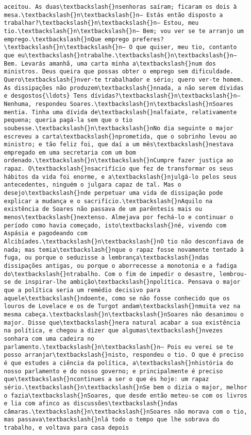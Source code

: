 \documentclass[11pt]{article}
\begin{document}
\begin{Verbatim}[commandchars=\\\{\}]
aceitou. As duas\textbackslash{}nsenhoras saíram; ficaram os dois à mesa.\textbackslash{}n\textbackslash{}n— Estás então disposto a trabalhar?\textbackslash{}n\textbackslash{}n— Estou, meu tio.\textbackslash{}n\textbackslash{}n— Bem; vou ver se te arranjo um emprego.\textbackslash{}nQue emprego preferes?\textbackslash{}n\textbackslash{}n— O que quiser, meu tio, contanto que eu\textbackslash{}ntrabalhe.\textbackslash{}n\textbackslash{}n— Bem. Levarás amanhã, uma carta minha a\textbackslash{}num dos ministros. Deus queira que possas obter o emprego sem dificuldade. Quero\textbackslash{}nver-te trabalhador e sério; quero ver-te homem. As dissipações não produzem\textbackslash{}nnada, a não serem dívidas e desgostos{\ldots} Tens dívidas?\textbackslash{}n\textbackslash{}n— Nenhuma, respondeu Soares.\textbackslash{}n\textbackslash{}nSoares mentia. Tinha uma dívida de\textbackslash{}nalfaiate, relativamente pequena; queria pagá-la sem que o tio soubesse.\textbackslash{}n\textbackslash{}nNo dia seguinte o major escreveu a carta\textbackslash{}nprometida, que o sobrinho levou ao ministro; e tão feliz foi, que daí a um mês\textbackslash{}nestava empregado em uma secretaria com um bom ordenado.\textbackslash{}n\textbackslash{}nCumpre fazer justiça ao rapaz. O\textbackslash{}nsacrifício que fez de transformar os seus hábitos da vida foi enorme, e a\textbackslash{}njulgá-lo pelos seus antecedentes, ninguém o julgara capaz de tal. Mas o desejo\textbackslash{}nde perpetuar uma vida de dissipação pode explicar a mudança e o sacrifício.\textbackslash{}nAquilo na existência de Soares não passava de um parêntesis mais ou menos\textbackslash{}nextenso. Almejava por fechá-lo e continuar o período como havia começado, isto\textbackslash{}né, vivendo com Aspásia e pagodeando com Alcibíades.\textbackslash{}n\textbackslash{}nO tio não desconfiava de nada; mas temia\textbackslash{}nque o rapaz fosse novamente tentado à fuga, ou porque o seduzisse a lembrança\textbackslash{}ndas dissipações antigas, ou porque o aborrecesse a monotonia e a fadiga do\textbackslash{}ntrabalho. Com o fim de impedir o desastre, lembrou-se de inspirar-lhe ambição\textbackslash{}npolítica. Pensava o major que a política seria um remédio decisivo para aquele\textbackslash{}ndoente, como se não fosse conhecido que os louros de Lovelace e os de Turgot andam\textbackslash{}nmuita vez na mesma cabeça.\textbackslash{}n\textbackslash{}nSoares não desanimou o major. Disse que\textbackslash{}nera natural acabar a sua existência na política, e chegou a dizer que algumas\textbackslash{}nvezes sonhara com uma cadeira no parlamento.\textbackslash{}n\textbackslash{}n— Pois eu verei se te posso arranjar\textbackslash{}nisto, respondeu o tio. O que é preciso é que estudes a ciência da política, a\textbackslash{}nhistória do nosso parlamento e do nosso governo; e principalmente é preciso que\textbackslash{}ncontinues a ser o que és hoje: um rapaz sério.\textbackslash{}n\textbackslash{}nSe bem o dizia o major, melhor o fazia\textbackslash{}nSoares, que desde então meteu-se com os livros e lia com afinco as discussões\textbackslash{}ndas câmaras.\textbackslash{}n\textbackslash{}nSoares não morava com o tio, mas passava\textbackslash{}nlá todo o tempo que lhe sobrava do trabalho, e voltava para casa depois 
\end{Verbatim}
\end{document}
